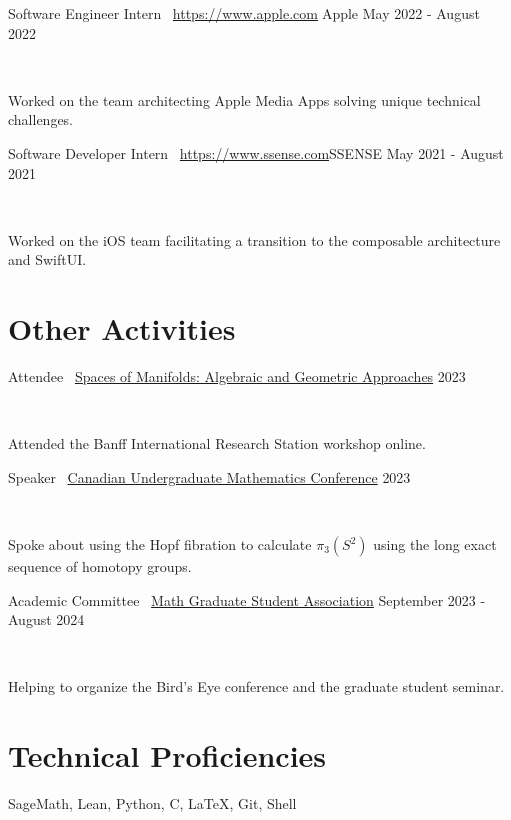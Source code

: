 \documentclass[]{style}
\begin{document}
\begin{entrylist}

\vspace{1mm}

\entry
{Software Engineer Intern \ {\normalfont \url{https://www.apple.com}{Apple}}}
{May 2022 - August 2022}
{ ~ \vspace{-2.5mm}

Worked on the team architecting Apple Media Apps solving unique technical challenges. }

\entry
{Software Developer Intern \ {\normalfont \url{https://www.ssense.com}{SSENSE}}}
{May 2021 - August 2021}
{ ~ \vspace{-2.5mm}

Worked on the iOS team facilitating a transition to the composable architecture and SwiftUI.}

\end{entrylist}

\newpage

\section{Other Activities}

\begin{entrylist}

\vspace{1mm}

\entry
{Attendee \ {\normalfont \underline{Spaces of Manifolds: Algebraic and Geometric Approaches}}}
{2023}
{ ~ \vspace{-2.5mm}

Attended the Banff International Research Station workshop online.}

\entry
{Speaker \ {\normalfont \underline{Canadian Undergraduate Mathematics Conference}}}
{2023}
{ ~ \vspace{-2.5mm}

Spoke about using the Hopf fibration to calculate $\pi_3(S^2)$ using the long exact sequence of homotopy groups.}

\entry
{Academic Committee \ {\normalfont \underline{Math Graduate Student Association}}}
{September 2023 - August 2024}
{ ~ \vspace{-2.5mm}

Helping to organize the Bird's Eye conference and the graduate student seminar.}

\end{entrylist}

\section{Technical Proficiencies}

SageMath, Lean, Python, C, \LaTeX, Git, Shell
\end{document}

